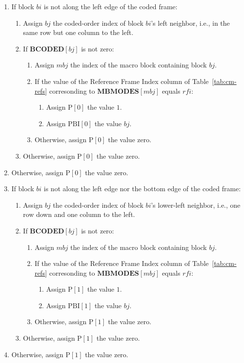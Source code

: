 \documentclass[9pt,letterpaper]{book}
\newcommand{\idx}[1]{{\ensuremath{\mathit{#1}}}}
\newcommand{\bi}{\idx{bi}}
\newcommand{\bj}{\idx{bj}}
\newcommand{\mbj}{\idx{mbj}}
\newcommand{\rfi}{\idx{rfi}}
\newcommand{\bitvar}[1]{\ensuremath{\mathbf{\bm{#1}}}}
\newcommand{\locvar}[1]{\ensuremath{\mathrm{#1}}}
\numberwithin{equation}{chapter}
\numberwithin{figure}{chapter}
\numberwithin{table}{chapter}
\begin{document}
\begin{enumerate}
\item
If block \locvar{\bi} is not along the left edge of the coded frame:
\begin{enumerate}
\item
Assign \locvar{\bj} the coded-order index of block \locvar{\bi}'s left
 neighbor, i.e., in the same row but one column to the left.
\item
If $\bitvar{BCODED}[\bj]$ is not zero:
\begin{enumerate}
\item
Assign \locvar{\mbj} the index of the macro block containing block
 \locvar{\bj}.
\item
If the value of the Reference Frame Index column of Table~\ref{tab:cm-refs}
 corresonding to $\bitvar{MBMODES}[\locvar{\mbj}]$ equals \locvar{\rfi}:
\begin{enumerate}
\item
Assign $\locvar{P}[0]$ the value $1$.
\item
Assign $\locvar{PBI}[0]$ the value \locvar{\bj}.
\end{enumerate}
\item
Otherwise, assign $\locvar{P}[0]$ the value zero.
\end{enumerate}
\item
Otherwise, assign $\locvar{P}[0]$ the value zero.
\end{enumerate}
\item
Otherwise, assign $\locvar{P}[0]$ the value zero.

\item
If block \locvar{\bi} is not along the left edge nor the bottom edge of the
 coded frame:
\begin{enumerate}
\item
Assign \locvar{\bj} the coded-order index of block \locvar{\bi}'s lower-left
 neighbor, i.e., one row down and one column to the left.
\item
If $\bitvar{BCODED}[\bj]$ is not zero:
\begin{enumerate}
\item
Assign \locvar{\mbj} the index of the macro block containing block
 \locvar{\bj}.
\item
If the value of the Reference Frame Index column of Table~\ref{tab:cm-refs}
 corresonding to $\bitvar{MBMODES}[\locvar{\mbj}]$ equals \locvar{\rfi}:
\begin{enumerate}
\item
Assign $\locvar{P}[1]$ the value $1$.
\item
Assign $\locvar{PBI}[1]$ the value \locvar{\bj}.
\end{enumerate}
\item
Otherwise, assign $\locvar{P}[1]$ the value zero.
\end{enumerate}
\item
Otherwise, assign $\locvar{P}[1]$ the value zero.
\end{enumerate}
\item
Otherwise, assign $\locvar{P}[1]$ the value zero.


\end{enumerate}
\end{document}
